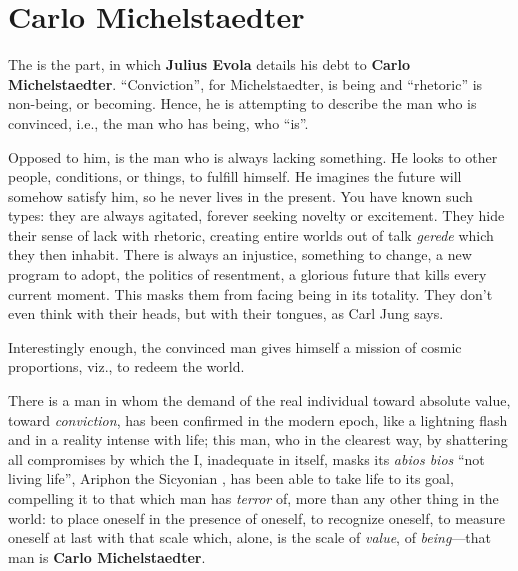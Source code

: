 \section{Carlo Michelstaedter}

\label{sec:Michelstaedter}

\begin{quotationx}
The is the part, in which \textbf{Julius Evola} details his debt to \textbf{Carlo Michelstaedter}. ``Conviction'', for Michelstaedter, is being and ``rhetoric'' is non-being, or becoming. Hence, he is attempting to describe the man who is convinced, i.e., the man who has being, who ``is''.

Opposed to him, is the man who is always lacking something. He looks to other people, conditions, or things, to fulfill himself. He imagines the future will somehow satisfy him, so he never lives in the present. You have known such types: they are always agitated, forever seeking novelty or excitement. They hide their sense of lack with rhetoric, creating entire worlds out of talk \emph{gerede} which they then inhabit. There is always an injustice, something to change, a new program to adopt, the politics of resentment, a glorious future that kills every current moment. This masks them from facing being in its totality. They don't even think with their heads, but with their tongues, as Carl Jung says.

Interestingly enough, the convinced man gives himself a mission of cosmic proportions, viz., to redeem the world.
\end{quotationx}


There is a man in whom the demand of the real individual toward absolute value, toward \emph{conviction}, has been confirmed in the modern epoch, like a lightning flash and in a reality intense with life; this man, who in the clearest way, by shattering all compromises by which the I, inadequate in itself, masks its \emph{abios bios} ``not living life'', Ariphon the Sicyonian , has been able to take life to its goal, compelling it to that which man has \emph{terror} of, more than any other thing in the world: to place oneself in the presence of oneself, to recognize oneself, to measure oneself at last with that scale which, alone, is the scale of \emph{value}, of \emph{being}---that man is \textbf{Carlo Michelstaedter}.

